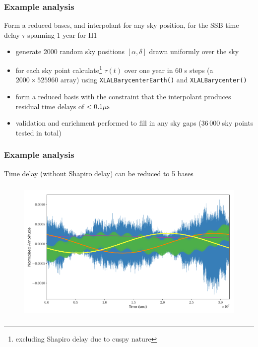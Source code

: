 \begin{frame}

\frametitle{Example analysis}
\label{exampleanalysis}

Form a reduced bases, and interpolant for any sky position, for the SSB time delay $\tau$ spanning
1 year for H1

\begin{itemize}
\item generate 2000 random sky positions $[\alpha, \delta]$ drawn uniformly over the sky

\item for each sky point calculate\footnote{excluding Shapiro delay due to cuspy nature} $\tau(t)$ over one year in 60 s steps (a $2000 \times 525960$ array)
 using \texttt{XLALBarycenterEarth()} and \texttt{XLALBarycenter()}

\item form a reduced basis with the constraint that the interpolant produces residual
 time delays of $< 0.1\mu{\rm s}$

\item validation and enrichment performed to fill in any sky gaps ($36\,000$ sky points tested
 in total)

\end{itemize}

\end{frame}

\begin{frame}

\frametitle{Example analysis}
\label{exampleanalysis}

Time delay (without Shapiro delay) can be reduced to 5 bases

\begin{figure}[htbp]
\centering
\includegraphics[keepaspectratio,width=\textwidth,height=200pt]{images/reduced_bases.pdf}
\label{bases}
\end{figure}

\end{frame}

